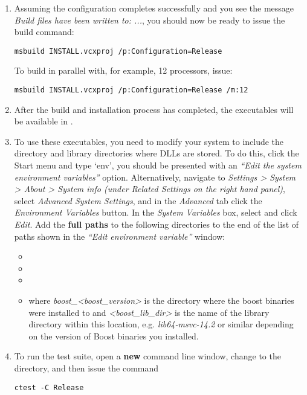 \begin{enumerate}
  \item Assuming the configuration completes successfully and you see the message \emph{Build files have been written to: ...}, you should now be ready to issue the build command:
  \begin{lstlisting}[style=BashInputStyle]
    msbuild INSTALL.vcxproj /p:Configuration=Release
  \end{lstlisting}
  To build in parallel with, for example, 12 processors, issue:
  \begin{lstlisting}[style=BashInputStyle]
    msbuild INSTALL.vcxproj /p:Configuration=Release /m:12
  \end{lstlisting}
  \item After the build and installation process has completed, the executables will be
  available in .
  \item To use these executables, you need to modify your system  to
  include the  directory and library directories where DLLs are stored. To do this, click the
	Start menu and type `env', you should be presented with an \emph{``Edit the system environment variables''}
	option. Alternatively, navigate to \emph{Settings > System > About > System info
	(under Related Settings on the right hand panel)}, select
	\emph{Advanced System Settings}, and in the \emph{Advanced} tab click the
	\emph{Environment Variables} button. In the \emph{System Variables} box, select  and click
  \emph{Edit}. Add the \textbf{full paths} to the following directories to the end of the list of paths shown in the \emph{``Edit environment variable''} window:
  \begin{itemize}
    \item {}
    \item {}
    \item {}
    \item {}
    where \emph{boost\_<boost\_version>} is the directory where the boost binaries were installed to and
    \emph{<boost\_lib\_dir>} is the name of the library directory within this location, e.g.
    \emph{lib64-msvc-14.2} or similar depending on the version of Boost binaries you installed.
  \end{itemize}
  \item To run the test suite, open a \textbf{new} command line window, change
  to the  directory, and then issue the command
  \begin{lstlisting}[style=BashInputStyle]
    ctest -C Release
  \end{lstlisting}
\end{enumerate}

